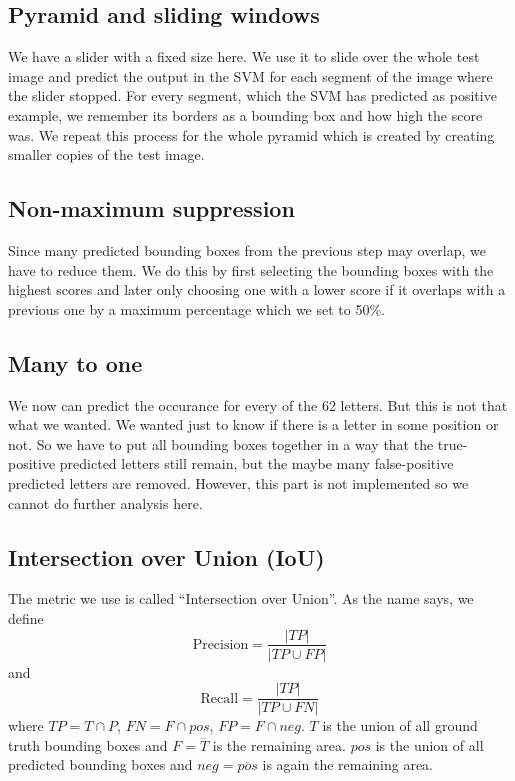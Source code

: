 \documentclass[conference]{IEEEtran}
\begin{document}
\subsection{Pyramid and sliding windows}\label{sec:slide}

We have a slider with a fixed size here. We use it to slide over the whole test image and predict the output in the SVM for each segment of the image where the slider stopped. For every segment, which the SVM has predicted as positive example, we remember its borders as a bounding box and how high the score was. We repeat this process for the whole pyramid which is created by creating smaller copies of the test image.

\subsection{Non-maximum suppression}\label{sec:non-max-sup}

Since many predicted bounding boxes from the previous step may overlap, we have to reduce them. We do this by first selecting the bounding boxes with the highest scores and later only choosing one with a lower score if it overlaps with a previous one by a maximum percentage which we set to 50\%.  

\subsection{Many to one}\label{sec:many-to-one}

We now can predict the occurance for every of the 62 letters. But this is not that what we wanted. We wanted just to know if there is a letter in some position or not. So we have to put all bounding boxes together in a way that the true-positive predicted letters still remain, but the maybe many false-positive predicted letters are removed. However, this part is not implemented so we cannot do further analysis here.

\subsection{Intersection over Union (IoU) \cite{bib:iou}}\label{sec:iou}

The metric we use is called ``Intersection over Union''. As the name says, we define
$$\textrm{Precision}=\frac{|TP|}{|TP \cup FP|}$$
and
$$\textrm{Recall}=\frac{|TP|}{|TP \cup FN|}$$
where $TP = T \cap P$, $FN = F \cap pos$, $FP = F \cap neg$. $T$ is the union of all ground truth bounding boxes and $F = \overline{T}$ is the remaining area. $pos$ is the union of all predicted bounding boxes and $neg = \overline{pos}$ is again the remaining area.
\end{document}
